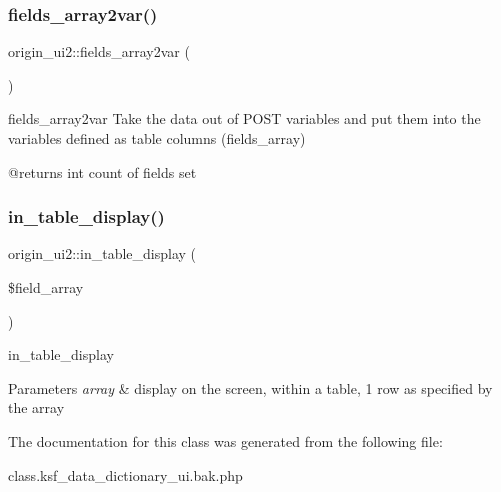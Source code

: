 \subsubsection{\texorpdfstring{fields\+\_\+array2var()}{fields\_array2var()}}
{\footnotesize\ttfamily origin\+\_\+ui2\+::fields\+\_\+array2var (\begin{DoxyParamCaption}{ }\end{DoxyParamCaption})}

fields\+\_\+array2var Take the data out of P\+O\+ST variables and put them into the variables defined as table columns (fields\+\_\+array)

\begin{DoxyVerb}@returns int count of fields set\end{DoxyVerb}
 \hypertarget{classorigin__ui2_a59694769d976755cce9b17e83780bacf}{}\label{classorigin__ui2_a59694769d976755cce9b17e83780bacf} 
\subsubsection{\texorpdfstring{in\+\_\+table\+\_\+display()}{in\_table\_display()}}
{\footnotesize\ttfamily origin\+\_\+ui2\+::in\+\_\+table\+\_\+display (\begin{DoxyParamCaption}\item[{}]{\$field\+\_\+array }\end{DoxyParamCaption})}

in\+\_\+table\+\_\+display


\begin{DoxyParams}{Parameters}
{\em array} & display on the screen, within a table, 1 row as specified by the array \\
\hline
\end{DoxyParams}


The documentation for this class was generated from the following file\+:\begin{DoxyCompactItemize}
\item 
class.\+ksf\+\_\+data\+\_\+dictionary\+\_\+ui.\+bak.\+php\end{DoxyCompactItemize}
